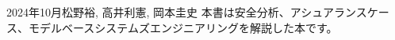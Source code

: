 \begin{preface}{2024年10月}{松野裕, 高井利憲, 岡本圭史}
本書は安全分析、アシュアランスケース、モデルベースシステムズエンジニアリングを解説した本です。



\end{preface}
